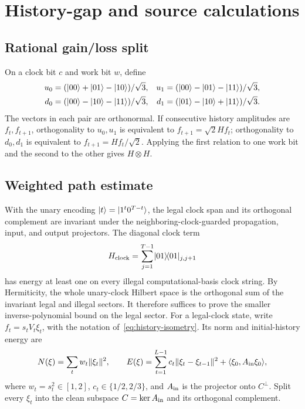 \section{History-gap and source calculations}
\label{app:source-details}

\subsection{Rational gain/loss split}
\label{app:rational-split}

On a clock bit \(c\) and work bit \(w\), define
\[
\begin{aligned}
u_0&=(\lvert 00\rangle+\lvert 01\rangle-\lvert 10\rangle)/\sqrt3,&
u_1&=(\lvert 00\rangle-\lvert 01\rangle-\lvert 11\rangle)/\sqrt3,\\
d_0&=(\lvert 00\rangle-\lvert 10\rangle-\lvert 11\rangle)/\sqrt3,&
d_1&=(\lvert 01\rangle-\lvert 10\rangle+\lvert 11\rangle)/\sqrt3.
\end{aligned}
\]
The vectors in each pair are orthonormal.  If consecutive history amplitudes
are \(f_t,f_{t+1}\), orthogonality to \(u_0,u_1\) is equivalent to
\(f_{t+1}=\sqrt2Hf_t\); orthogonality to \(d_0,d_1\) is equivalent to
\(f_{t+1}=Hf_t/\sqrt2\).  Applying the first relation to one work bit and the
second to the other gives \(H\otimes H\).

\subsection{Weighted path estimate}

With the unary encoding \(\lvert t\rangle=\lvert 1^t0^{T-t}\rangle\), the legal clock span and
its orthogonal complement are invariant under the neighboring-clock-guarded
propagation, input, and output projectors.  The diagonal clock term
\[
H_{\rm clock}=\sum_{j=1}^{T-1}\lvert 01\rangle\!\langle 01\rvert_{j,j+1}
\]
has energy at least one on every illegal computational-basis clock string.
By Hermiticity, the whole unary-clock Hilbert space is the orthogonal sum of
the invariant legal and illegal sectors.  It therefore
suffices to prove the smaller inverse-polynomial bound on the legal sector.
For a legal-clock state, write \(f_t=s_tV_t\xi_t\), with the notation of~\cref{eq:history-isometry}. Its norm and initial-history energy are
\[
N(\xi)=\sum_tw_t\|\xi_t\|^2,
\qquad
E(\xi)=\sum_{t=1}^{L-1}c_t\|\xi_t-\xi_{t-1}\|^2
+\langle\xi_0,A_{\rm in}\xi_0\rangle,
\]
where \(w_t=s_t^2\in[1,2]\), \(c_t\in\{1/2,2/3\}\), and
\(A_{\rm in}\) is the projector onto \(C^\perp\). Split every \(\xi_t\) into
the clean subspace \(C=\ker A_{\rm in}\) and its orthogonal complement.

